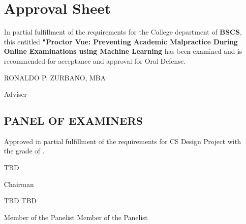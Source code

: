 \section*{\hfill Approval Sheet \hfill}

In partial fulfillment of the requirements for the College department of \textbf{BSCS}, this entitled \textbf{"Proctor Vue: Preventing Academic Malpractice During Online Examinations using Machine Learning} has been examined and is recommended for acceptance and approval for Oral Defense.

\vspace{2em}

\begin{flushright}
    \uppercase{Ronaldo P. Zurbano, MBA}

    Adviser
\end{flushright}

\vspace{2em}

\subsection*{\centering PANEL OF EXAMINERS}

Approved in partial fulfillment of the requirements for CS Design Project with the grade of \makebox[1.0in]{\hrulefill}.

\vspace{2em}

\begin{center}
    \uppercase{TBD}

    Chairman
\end{center}

\vspace{2em}

\noindent \uppercase{TBD} \hfill \uppercase{TBD}

\noindent Member of the Panelist \hfill Member of the Panelist
